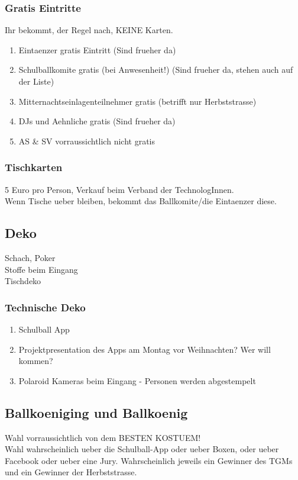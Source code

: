 \documentclass[12pt]{article}
\begin{document}
\subsubsection{Gratis Eintritte}
Ihr bekommt, der Regel nach, KEINE Karten.
\begin{enumerate}
\item Eintaenzer gratis Eintritt (Sind frueher da)
\item Schulballkomite gratis (bei Anwesenheit!) (Sind frueher da, stehen auch auf der Liste)
\item Mitternachtseinlagenteilnehmer gratis (betrifft nur Herbststrasse)
\item DJs und Aehnliche gratis (Sind frueher da)
\item AS \& SV vorraussichtlich nicht gratis 
\end{enumerate}
\subsubsection{Tischkarten}
5 Euro pro Person, Verkauf beim Verband der TechnologInnen. \\
Wenn Tische ueber bleiben, bekommt das Ballkomite/die Eintaenzer diese.

\subsection{Deko}
Schach, Poker \\
Stoffe beim Eingang \\
Tischdeko \\
\subsubsection{Technische Deko}
\begin{enumerate}
\item Schulball App
\item Projektpresentation des Apps am Montag vor Weihnachten? Wer will kommen?
\item Polaroid Kameras beim Eingang - Personen werden abgestempelt
\end{enumerate}
\subsection{Ballkoeniging und Ballkoenig}
Wahl vorraussichtlich von dem BESTEN KOSTUEM!
\\
Wahl wahrscheinlich ueber die Schulball-App oder ueber Boxen, oder ueber Facebook oder ueber eine Jury.
Wahrscheinlich jeweils ein Gewinner des TGMs und ein Gewinner der Herbststrasse.
\newpage
\end{document}
